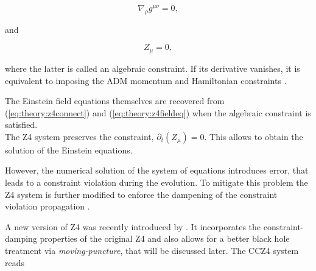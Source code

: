 \documentclass[11pt,a4paper,headinclude=true,DIV=14,BCOR=8mm,chapterprefix,listof=totoc,twoside,openright,abstracton]{scrbook}
\begin{document}
\begin{equation}
    \nabla_{\rho} g^{\mu\nu} = 0, 
    \label{eq:theory:z4connect}
\end{equation}

and

\begin{equation}
    Z_{\mu} = 0,
\end{equation}

where the latter is called an algebraic constraint. If its derivative vanishes, it is equivalent to imposing the ADM momentum and Hamiltonian constraints \cite{Bona:2009}. 

The Einstein field equations themselves are recovered from (\ref{eq:theory:z4connect}) and (\ref{eq:theory:z4fieldeq}) when the algebraic constraint is satisfied. \\

The Z4 system preserves the constraint, $\partial_t (Z_{\mu})= 0$. This allows to obtain the solution of the Einstein equations. 

However, the numerical solution of the system of equations introduces error, that leads to a constraint violation during the evolution. To mitigate this problem the Z4 system is further modified to enforce the dampening of the constraint violation propagation \cite{Gundlach:2005eh}.

A new version of Z4 was recently introduced by \cite{Alic:2011gg}. It incorporates the constraint-damping properties of the original Z4 and also allows for a better black hole treatment via \textit{moving-puncture}, that will be discussed later. 
The CCZ4 system reads 
\end{document}
